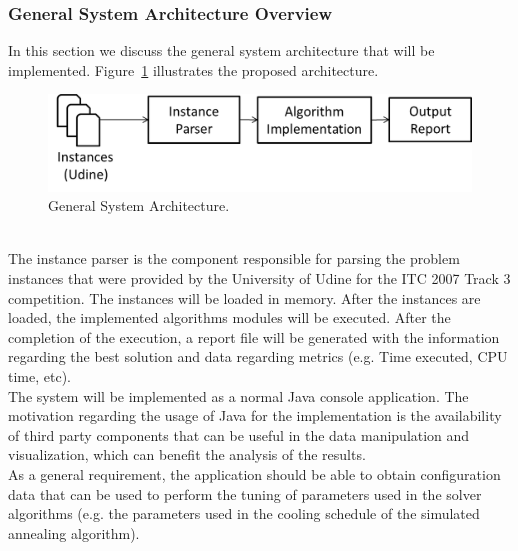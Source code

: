 \subsubsection{General System Architecture Overview}
\label{subsubsec:solution-architecture-overview}
In this section we discuss the general system architecture that will be implemented. Figure~\ref{fig:systemArchitecture} illustrates the proposed architecture.\\
\begin{figure}[h!]
 \centering
   \includegraphics[width=12cm]{./images/figures/Fig4_SystemArchitecture.png}
   \caption{General System Architecture.}
   \label{fig:systemArchitecture}
\end{figure}\\
The instance parser is the component responsible for parsing the problem instances that were provided by the University of Udine for the ITC 2007 Track 3 competition. The instances will be loaded in memory. After the instances are loaded, the implemented algorithms modules will be executed. After the completion of the execution, a report file will be generated with the information regarding the best solution and data regarding metrics (e.g. Time executed, CPU time, etc).\\
The system will be implemented as a normal Java console application. The motivation regarding the usage of Java for the implementation is the availability of third party components that can be useful in the data manipulation and visualization, which can benefit the analysis of the results. \\
As a general requirement, the application should be able to obtain configuration data that can be used to perform the tuning of parameters used in the solver algorithms (e.g. the parameters used in the cooling schedule of the simulated annealing algorithm).
